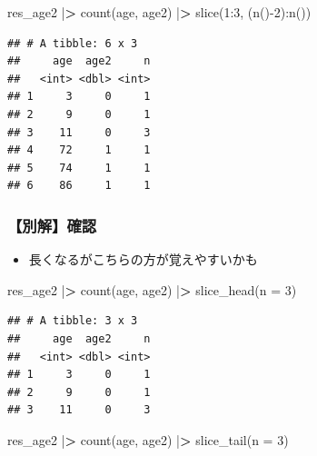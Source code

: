 \documentclass[
  xelatex,ja=standard, b5paper]{bxjsbook}
\newenvironment{Shaded}{\begin{snugshade}}{\end{snugshade}}
\newcommand{\AttributeTok}[1]{\textcolor[rgb]{0.77,0.63,0.00}{#1}}
\newcommand{\DecValTok}[1]{\textcolor[rgb]{0.00,0.00,0.81}{#1}}
\newcommand{\ErrorTok}[1]{\textcolor[rgb]{0.64,0.00,0.00}{\textbf{#1}}}
\newcommand{\FunctionTok}[1]{\textcolor[rgb]{0.00,0.00,0.00}{#1}}
\newcommand{\NormalTok}[1]{#1}
\newcommand{\SpecialCharTok}[1]{\textcolor[rgb]{0.00,0.00,0.00}{#1}}
\providecommand{\tightlist}{%
  \setlength{\itemsep}{0pt}\setlength{\parskip}{0pt}}
\begin{document}
\begin{Shaded}
\begin{Highlighting}[]
\NormalTok{res\_age2 }\SpecialCharTok{|}\ErrorTok{\textgreater{}} 
  \FunctionTok{count}\NormalTok{(age, age2) }\SpecialCharTok{|}\ErrorTok{\textgreater{}} 
  \FunctionTok{slice}\NormalTok{(}\DecValTok{1}\SpecialCharTok{:}\DecValTok{3}\NormalTok{, (}\FunctionTok{n}\NormalTok{()}\SpecialCharTok{{-}}\DecValTok{2}\NormalTok{)}\SpecialCharTok{:}\FunctionTok{n}\NormalTok{())}
\end{Highlighting}
\end{Shaded}

\begin{verbatim}
## # A tibble: 6 x 3
##     age  age2     n
##   <int> <dbl> <int>
## 1     3     0     1
## 2     9     0     1
## 3    11     0     3
## 4    72     1     1
## 5    74     1     1
## 6    86     1     1
\end{verbatim}

\hypertarget{ux5225ux89e3ux78baux8a8d}{%
\subsubsection{【別解】確認}\label{ux5225ux89e3ux78baux8a8d}}

\begin{itemize}
\tightlist
\item
  長くなるがこちらの方が覚えやすいかも
\end{itemize}

\begin{Shaded}
\begin{Highlighting}[]
\NormalTok{res\_age2 }\SpecialCharTok{|}\ErrorTok{\textgreater{}} 
  \FunctionTok{count}\NormalTok{(age, age2) }\SpecialCharTok{|}\ErrorTok{\textgreater{}} 
  \FunctionTok{slice\_head}\NormalTok{(}\AttributeTok{n =} \DecValTok{3}\NormalTok{)}
\end{Highlighting}
\end{Shaded}

\begin{verbatim}
## # A tibble: 3 x 3
##     age  age2     n
##   <int> <dbl> <int>
## 1     3     0     1
## 2     9     0     1
## 3    11     0     3
\end{verbatim}

\begin{Shaded}
\begin{Highlighting}[]
\NormalTok{res\_age2 }\SpecialCharTok{|}\ErrorTok{\textgreater{}} 
  \FunctionTok{count}\NormalTok{(age, age2) }\SpecialCharTok{|}\ErrorTok{\textgreater{}} 
  \FunctionTok{slice\_tail}\NormalTok{(}\AttributeTok{n =} \DecValTok{3}\NormalTok{)}
\end{Highlighting}
\end{Shaded}
\end{document}
